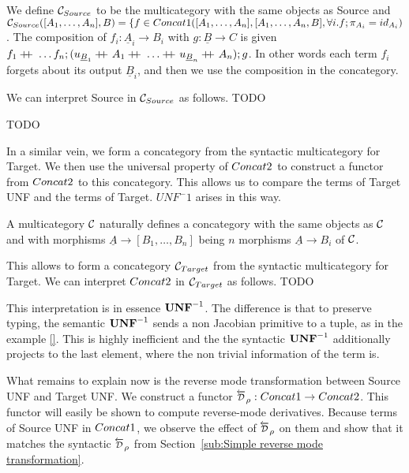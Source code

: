 \begin{definition}
    We define $\mathcal{C}_{Source}$ to be the multicategory with the same objects as Source and 
    $\mathcal{C}_{Source}([A_1,\ldots,A_n],B)=\{f\in Concat1([A_1,\ldots,A_n],[A_1,\ldots,A_n,B], \forall i.f;\pi_{A_i}=id_{A_i})$.
    The composition of $f_i:\underline{A}_i\to B_i$ with $g:\underline{B}\to C$ is given 
    $f_1\concatcomp\ldots f_n;(u_{\underline{B}_1}\concatcomp A_1 \concatcomp \ldots \concatcomp u_{\underline{B}_n}\concatcomp A_n);g$.
    In other words each term $f_i$ forgets about its output $\underline{B}_i$, and then we use the composition in the concategory.
\end{definition}

We can interpret Source in $\mathcal{C}_{Source}$ as follows.
TODO

\begin{proposition}
    TODO
\end{proposition}

In a similar vein, we form a concategory from the syntactic multicategory for Target.
We then use the universal property of $Concat2$ to construct a functor from $Concat2$ to this concategory.
This allows us to compare the terms of Target UNF and the terms of Target. 
$UNF^-1$ arises in this way.

\begin{definition}
    A multicategory $\mathcal{C}$ naturally defines a concategory with the same objects as $\mathcal{C}$ and
    with morphisms $\underline{A}\to [B_1,\ldots,B_n]$ being $n$ morphisms $\underline{A}\to B_i$ of $\mathcal{C}$. 
\end{definition}

This allows to form a concategory $\mathcal{C}_{Target}$ from the syntactic multicategory for Target.
We can interpret $Concat2$ in $\mathcal{C}_{Target}$ as follows.
TODO

This interpretation is in essence $\mathbf{UNF}^{-1}$. 
The difference is that to preserve typing, the semantic $\mathbf{UNF}^{-1}$
sends a non Jacobian primitive to a tuple, as in the example \ref{}. 
This is highly inefficient and the the syntactic $\mathbf{UNF}^{-1}$ 
additionally projects to the last element, where the non trivial information of the term is.

What remains to explain now is the reverse mode transformation between Source UNF and Target UNF.
We construct a functor $\Dsynrevsymbol_{\rho}:\ConcatS\to\ConcatT$. 
This functor will easily be shown to compute reverse-mode derivatives.
Because terms of Source UNF in $Concat1$, we observe the effect of $\Dsynrevsymbol_{\rho}$ on them
and show that it matches the syntactic $\Dsynrevsymbol_{\rho}$ 
from Section~\ref{sub:Simple reverse mode transformation}.

